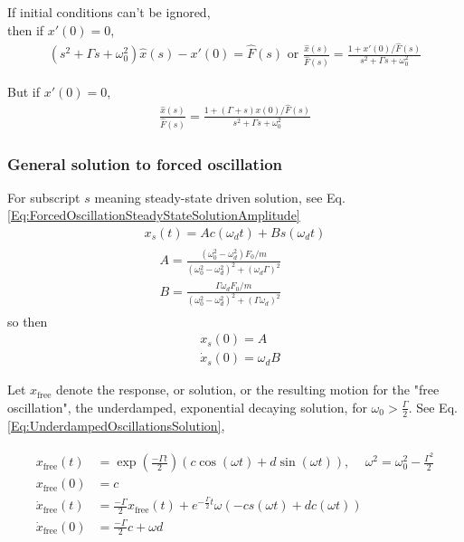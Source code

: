 \documentclass[10pt]{amsart}
\begin{document}
\begin{multicols*}{2}
If initial conditions can't be ignored, \\
then if $x'(0) =0$,
\[
\begin{gathered}
(s^2 + \Gamma s + \omega_0^2) \widehat{x}(s) - x'(0) = \widehat{F}(s) \text{ or } \frac{ \widehat{x}(s) }{ \widehat{F}(s) } = \frac{ 1 + x'(0) / \widehat{F}(s) }{ s^2 + \Gamma s + \omega_0^2 }
\end{gathered}
\]

But if $x'(0) =0$,
\[
\begin{gathered}
\frac{ \widehat{x}(s) }{ \widehat{F}(s) } = \frac{ 1 + (\Gamma +s )x(0) / \widehat{F}(s) }{ s^2 + \Gamma s + \omega_0^2 }
\end{gathered}
\]

\subsubsection{General solution to forced oscillation}

For subscript $s$ meaning steady-state driven solution, see Eq. \ref{Eq:ForcedOscillationSteadyStateSolutionAmplitude}
\[
\begin{gathered}
x_s(t) = Ac(\omega_d t) + Bs(\omega_d t) \\
\begin{aligned}
& A = \frac{ (\omega_0^2 - \omega_d^2) F_0 / m }{ (\omega_0^2 - \omega_d^2)^2 + (\omega_d \Gamma)^2 } \\
& B = \frac{ \Gamma \omega_d F_0 / m }{ (\omega_0^2 - \omega_d^2)^2 + (\Gamma \omega_d)^2 }
\end{aligned}
\end{gathered}
\] 
so then
\[
\begin{aligned}
& x_s(0) = A \\
& \dot{x}_s(0) = \omega_dB
\end{aligned}
\]

Let $x_{\text{free}}$ denote the response, or solution, or the resulting motion for the "free oscillation", the underdamped, exponential decaying solution, for $\omega_0 > \frac{\Gamma}{2}$. See Eq. \ref{Eq:UnderdampedOscillationsSolution},

\[
\begin{gathered}
\begin{aligned}
x_{\text{free}}(t) & = \exp{ \left( \frac{-\Gamma t}{2} \right) } (c\cos{(\omega t)} + d\sin{ (\omega t)} ), \quad \, \omega^2 = \omega_0^2 -\frac{\Gamma^2}{2} \\
x_{\text{free}}(0) &= c \\
\dot{x}_{\text{free}}(t) & = \frac{-\Gamma}{2} x_{\text{free}}(t) + e^{-\frac{\Gamma}{2} t} \omega( - cs(\omega t) + dc(\omega t) ) \\
\dot{x}_{\text{free}}(0) & = \frac{-\Gamma}{2} c + \omega d
\end{aligned}
\end{gathered}
\]


\end{multicols*}
\end{document}
